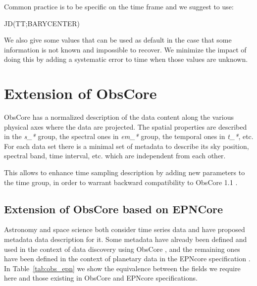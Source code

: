 \documentclass[11pt,a4paper]{ivoa}
\begin{document}
Common practice is to be specific on the time frame and we suggest to use:
\begin{center}
  JD(TT;BARYCENTER)
\end{center}
We also give some values that can be used as default in the case that some information is not known and impossible to recover. We minimize the impact of doing this by adding a systematic error to time when those values are unknown.

\section{Extension of ObsCore}
ObsCore has a normalized description of the data content along the various physical axes where the data are projected.
The spatial properties are described in the \emph{s\_*} group, the spectral ones in \emph{em\_*} group, the temporal ones in \emph{t\_*}, etc.
For each data set there is a minimal  set of metadata to describe its sky position, spectral band, time interval, etc. which are independent from each other.

This allows to enhance time sampling description by adding new parameters to the time group, in order to warrant backward compatibility to ObsCore 1.1 .

\subsection{Extension of ObsCore based on EPNCore}
Astronomy and space science both consider time series data and have proposed metadata data description for it. Some metadata have already been defined and used in the context of data discovery using ObsCore \citep{2017ivoa.spec.0509L}, and the remaining ones have been defined in the context of planetary data in the EPNcore specification \citep{2022ivoa.spec.0822E}. In Table~\ref{tab:obs_epn} we show the equivalence between the fields we require here and those existing in  ObsCore and EPNcore specifications.
\end{document}

